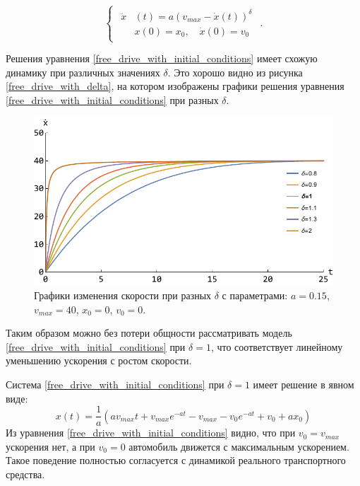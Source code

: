 \documentclass[12pt, a4paper]{extarticle}
\numberwithin{equation}{section}
\begin{document}
\begin{equation} \label{free_drive_with_initial_conditions}
\begin{cases}
\begin{split}
\ddot{x}&(t) = a\left( v_{max} - \dot{x}(t)\right)^\delta \\
&x(0)=x_0, \quad \dot{x}(0)=v_0
\end{split}
\end{cases}.
\end{equation}

Решения уравнения \eqref{free_drive_with_initial_conditions} имеет схожую динамику при различных значениях $\delta$. Это хорошо видно из рисунка \eqref{free_drive_with_delta}, на котором изображены графики решения уравнения \eqref{free_drive_with_initial_conditions} при разных $\delta$.

\begin{figure}[h!]
	\begin{center}
		\begin{minipage}[h!]{0.48\linewidth}
			\includegraphics[width=1\linewidth,height=0.2\textheight]
			{Images/free_drive_speed_with_different_delta.pdf}
		\end{minipage}
		\caption{Графики изменения скорости при разных $\delta$ с параметрами: $a=0.15$, $v_{max}=40$, $x_0=0$, $v_0=0$.}
		\label{free_drive_with_delta}
	\end{center}
\end{figure}

Таким образом можно без потери общности рассматривать модель \eqref{free_drive_with_initial_conditions} при $\delta=1$, что соответствует линейному уменьшению ускорения с ростом скорости.

Система \eqref{free_drive_with_initial_conditions} при $\delta=1$ имеет решение в явном виде:
\begin{equation*}
x(t) =\dfrac{1}{a}\left(av_{max}t+v_{max}e^{-at}-v_{max}-v_0e^{-at}+v_0+ax_0\right) 
\end{equation*}
Из уравнения \eqref{free_drive_with_initial_conditions} видно, что при $v_0=v_{max}$ ускорения нет, а при $v_0=0$ автомобиль движется с максимальным ускорением. Такое поведение полностью согласуется с динамикой реального транспортного средства.
\end{document}
